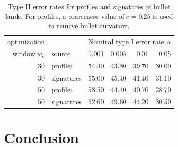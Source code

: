 \documentclass[12pt]{article}
\begin{document}
\begin{table}[ht]
\caption{\label{tab:type2} Type II error rates for profiles and signatures of bullet lands. For profiles, a coarseness value of $c = 0.25$ is used to remove bullet curvature.}
\centering
\begin{tabular}{rlrrrr}
  \hline
optimization && \multicolumn{4}{l}{Nominal type I error rate $\alpha$}\\  
window $w_o$ & source & 0.001 & 0.005 & 0.01 & 0.05 \\ 
  \hline
 30 & profiles & 54.40 & 43.80 & 39.70 & 30.00 \\ 
   30 & signatures & 55.00 & 45.40 & 41.40 & 31.10 \\ \hline
   50 & profiles & 58.50 & 44.40 & 40.70 & 28.70 \\ 
   50 & signatures & 62.60 & 49.60 & 44.20 & 30.50 \\ 
   \hline
\end{tabular}
\end{table}

\section{Conclusion}\label{conclusion}
\end{document}
